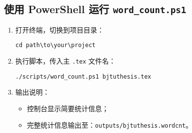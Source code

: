 \subsection*{使用 PowerShell 运行 \texttt{word\_count.ps1}}

\begin{enumerate}
  \item 打开终端，切换到项目目录：

  \begin{verbatim}
cd path\to\your\project
  \end{verbatim}

  \item 执行脚本，传入主 \verb|.tex| 文件名：

  \begin{verbatim}
./scripts/word_count.ps1 bjtuthesis.tex
  \end{verbatim}

  \item 输出说明：
  \begin{itemize}
    \item 控制台显示简要统计信息；
    \item 完整统计信息输出至：\verb|outputs/bjtuthesis.wordcnt|。
  \end{itemize}
\end{enumerate}

